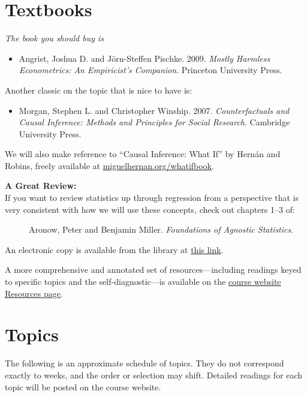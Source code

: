\documentclass[PS]{syllabus}
\begin{document}
\begin{syllabus}
\section*{Textbooks}

\emph{The book you should buy is}
\begin{itemize}
  \item Angrist, Joshua D. and J\"orn-Steffen Pischke. 2009. \emph{Mostly Harmless Econometrics: An Empiricist's Companion}. Princeton University Press.
  \end{itemize}
\smallskip
  Another classic on the topic that is nice to have is:
  \begin{itemize}
  \item Morgan, Stephen L. and Christopher Winship. 2007. \emph{Counterfactuals and Causal Inference: Methods and Principles for Social Research}. Cambridge University Press.
\end{itemize}
\bigskip

We will also make reference to ``Causal Inference: What If'' by Hern\'an and Robins, freely available at \href{https://miguelhernan.org/whatifbook}{miguelhernan.org/whatifbook}.

\textbf{A Great Review:}\\
If you want to review statistics up through regression from a perspective that is very consistent with how we will use these concepts, check out chapters 1--3 of:
\begin{description}
\item[] Aronow, Peter and Benjamin Miller. \emph{Foundations of Agnostic Statistics}.
\end{description}

An electronic copy is available from the library at \href{https://www.cambridge.org/core/books/foundations-of-agnostic-statistics/684756357E7E9B3DFF0A8157FB2DCECA}{this link}.

A more comprehensive and annotated set of resources---including readings keyed to specific topics and the self-diagnostic---is available on the \href{https://chadhazlett.github.io/ps200c-2026/resources.html}{course website Resources page}.


\section*{Topics}

The following is an approximate schedule of topics. They do not correspond exactly to weeks, and the order or selection may shift. Detailed readings for each topic will be posted on the course website.


\end{syllabus}
\end{document}
